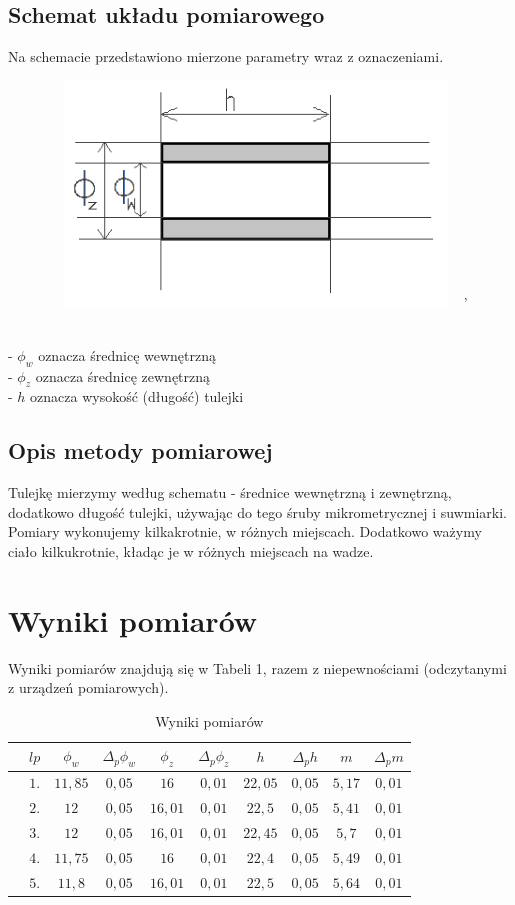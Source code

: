 \documentclass{article}
\begin{document}
\subsection{Schemat układu pomiarowego}
Na schemacie przedstawiono mierzone parametry wraz z oznaczeniami.
\begin{figure}
\includegraphics[width=11cm,height=6cm,angle=0]{schemat.png}'
\end{figure} \\
- $\phi_w$ oznacza średnicę wewnętrzną \\
- $\phi_z$ oznacza średnicę zewnętrzną \\
-  $h$ oznacza wysokość (długość) tulejki

\subsection{Opis metody pomiarowej}
Tulejkę mierzymy według schematu - średnice wewnętrzną i zewnętrzną, dodatkowo długość tulejki, używając do tego śruby mikrometrycznej i suwmiarki. Pomiary wykonujemy kilkakrotnie, w różnych miejscach. Dodatkowo ważymy ciało kilkukrotnie, kładąc je w różnych miejscach na wadze.

\section{Wyniki pomiarów}
Wyniki pomiarów znajdują się w Tabeli 1, razem z niepewnościami (odczytanymi z urządzeń pomiarowych).
\begin{table}[]
    \centering
    \begin{tabular}{c|c|c|c|c|c|c|c|c|c}
        & $lp$ & $\phi_w$ & $\Delta_p \phi_w$ & $\phi_z$ & $\Delta_p \phi_z$ & $h$ & $\Delta_p h$ & $m$& $\Delta_p m$ \\ \hline
        & $1.$ &$11,85$	 &	$0,05$ &$16$ & $0,01$	& $22,05$	& $0,05$ & $5,17$ &$0,01$ \\
        & $2.$ & $12$ & $0,05$ & $16,01$ & $0,01$ & $22,5$ & $0,05$ & $5,41$ & $0,01$ \\
        & $3.$ & $12$ & $0,05$ & $16,01$ & $0,01$ & $22,45$ & $0,05$ & $5,7$ & $0,01$ \\
        & $4.$ & $11,75$ & $0,05$	& $16$ & $0,01$ & $22,4$ & $0,05$ & $5,49$ & $0,01 $\\
        & $5.$ & $11,8$ & $0,05$ & $16,01$ & $0,01$ & $22,5$ & $0,05$ & $5,64$ & $0,01$ \\
    \end{tabular}
    \caption{Wyniki pomiarów}
    \label{tab:my_label}
\end{table}
\end{document}

